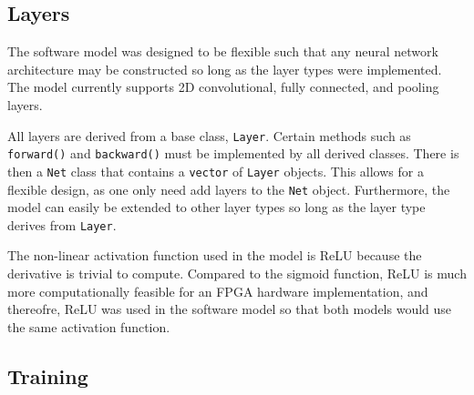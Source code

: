 \subsection{Layers}
The software model was designed to be flexible such that any neural network architecture may be constructed so long as the layer types were implemented. The model currently supports 2D convolutional, fully connected, and pooling layers. 
\par 
All layers are derived from a base class, \texttt{Layer}. Certain methods such as \texttt{forward()} and \texttt{backward()} must be implemented by all derived classes. There is then a \texttt{Net} class that contains a \texttt{vector} of \texttt{Layer} objects. This allows for a flexible design, as one only need add layers to the \texttt{Net} object. Furthermore, the model can easily be extended to other layer types so long as the layer type derives from \texttt{Layer}. 
\par
The non-linear activation function used in the model is ReLU because the derivative is trivial to compute. Compared to the sigmoid function, ReLU is much more computationally feasible for an FPGA hardware implementation, and thereofre, ReLU was used in the software model so that both models would use the same activation function.
\subsection{Training}
